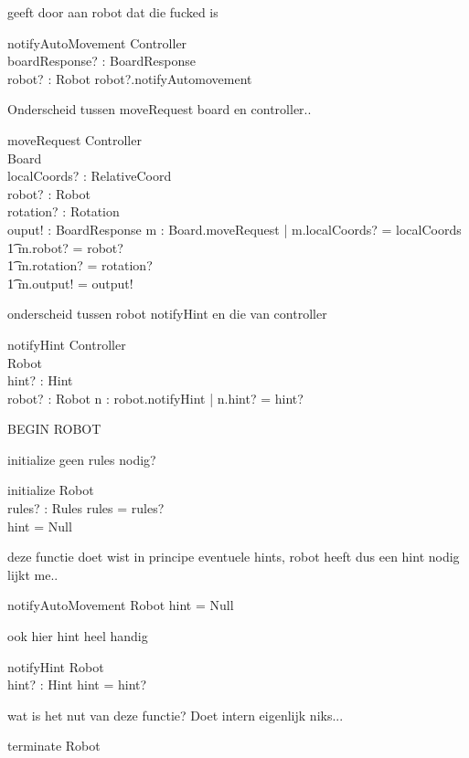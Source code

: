 \documentclass[a4paper,11pt]{article}
\begin{document}
geeft door aan robot dat die fucked is
\begin{schema}{notifyAutoMovement}
\Xi Controller \\
boardResponse? : BoardResponse \\
robot? : Robot
\where 
robot?.notifyAutomovement
\end{schema}

Onderscheid tussen moveRequest board en controller..
\begin{schema}{moveRequest}
\Xi Controller \\
\Delta Board \\
localCoords? : RelativeCoord \\
robot? : Robot \\
rotation? : Rotation \\
ouput! : BoardResponse
\where
\exists m : Board.moveRequest | m.localCoords? = localCoords \\ \t1
m.robot? = robot? \\ \t1
m.rotation? = rotation? \\ \t1
m.output! = output!
\end{schema}

onderscheid tussen robot notifyHint en die van controller
\begin{schema}{notifyHint}
\Xi Controller \\
\Delta Robot \\ 
hint? : Hint \\
robot? : Robot
\where
\exists n : robot.notifyHint | n.hint? = hint?
\end{schema}

BEGIN ROBOT

initialize geen rules nodig?
\begin{schema}{initialize}
\Delta Robot \\
rules? : Rules
\where
rules = rules? \\
hint = Null
\end{schema}

deze functie doet wist in principe eventuele hints, robot heeft dus een hint nodig lijkt me..
\begin{schema}{notifyAutoMovement}
\Delta Robot
\where
hint = Null
\end{schema}

ook hier hint heel handig
\begin{schema}{notifyHint}
\Delta Robot \\
hint? : Hint 
\where
hint = hint?
\end{schema}

wat is het nut van deze functie? Doet intern eigenlijk niks...
\begin{schema}{terminate}
\Xi Robot
\where
\end{schema}
\end{document}
